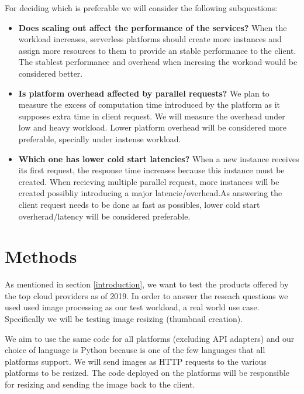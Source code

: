 \documentclass[11pt]{article}
\begin{document}
For deciding which is preferable we will consider the following subquestions:

\begin{itemize}

\item \textbf{Does scaling out affect the performance of the services?} When the workload increases, serverless platforms should create more instances and assign more resources to them to provide an stable performance to the client. The stablest performance and overhead when incresing the workoad would be considered better.

\item \textbf{Is platform overhead affected by parallel requests?} We plan to measure the excess of computation time introduced by the platform as it supposes extra time in client request. We will measure the overhead under low and heavy workload. Lower platform overhead will be considered more preferable, specially under instense workload.

\item \textbf{Which one has lower cold start latencies?} When a new instance receives its first request, the response time increases because this instance must be created. When recieving multiple parallel request, more instances will be created possibliy introducing a major latencie/overhead.As answering the client request needs to be done as fast as possibles, lower cold start overherad/latency will be considered preferable. 
\end{itemize}





\section{Methods}
\label{methods}
As mentioned in section \ref{introduction}, we want to test the products offered by the top cloud providers as of 2019. In order to answer the reseach questions we used used image processing as our test workload, a real world \cite{ii} use case. Specifically we will be testing image resizing (thumbnail creation).

 We aim to use the same code for all platforms (excluding API adapters) and our choice of language is Python because is one of the few languages that all platforms support. We will send images as HTTP requests to the various platforms to be resized. The code deployed on the platforms will be responsible for resizing and sending the image back to the client. 
\end{document}
